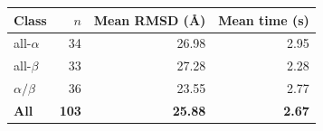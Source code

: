 \begin{tabular}{@{}lrrr@{}}
  \toprule
  Class & $n$ & Mean RMSD (\AA) & Mean time (s) \\
  \midrule
  all-$\alpha$ & 34 & 26.98 & 2.95 \\
  all-$\beta$ & 33 & 27.28 & 2.28 \\
  $\alpha/\beta$ & 36 & 23.55 & 2.77 \\
  \midrule
  \textbf{All} & \textbf{103} & \textbf{25.88} & \textbf{2.67} \\
  \bottomrule
\end{tabular}
